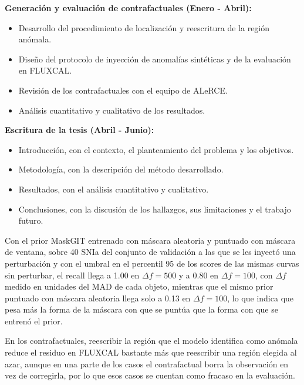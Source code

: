 \documentclass[11pt]{article}
\newcommand{\seccion}[1]{\vspace{6pt}\noindent{\large\textbf{$\bullet$ #1}}\par\vspace{2pt}}
\begin{document}
\textbf{Generación y evaluación de contrafactuales (Enero - Abril):}
\begin{itemize}
    \item Desarrollo del procedimiento de localización y reescritura de la región anómala.
    \item Diseño del protocolo de inyección de anomalías sintéticas y de la evaluación en FLUXCAL.
    \item Revisión de los contrafactuales con el equipo de ALeRCE.
    \item Análisis cuantitativo y cualitativo de los resultados.
\end{itemize}

\textbf{Escritura de la tesis (Abril - Junio):}
\begin{itemize}
    \item Introducción, con el contexto, el planteamiento del problema y los objetivos.
    \item Metodología, con la descripción del método desarrollado.
    \item Resultados, con el análisis cuantitativo y cualitativo.
    \item Conclusiones, con la discusión de los hallazgos, sus limitaciones y el trabajo futuro.
\end{itemize}

\seccion{Resultados preliminares}

Con el prior MaskGIT entrenado con máscara aleatoria y puntuado con máscara de ventana, sobre 40 SNIa del conjunto de validación a las que se les inyectó una perturbación y con el umbral en el percentil 95 de los scores de las mismas curvas sin perturbar, el recall llega a 1.00 en $\Delta f = 500$ y a 0.80 en $\Delta f = 100$, con $\Delta f$ medido en unidades del MAD de cada objeto, mientras que el mismo prior puntuado con máscara aleatoria llega solo a 0.13 en $\Delta f = 100$, lo que indica que pesa más la forma de la máscara con que se puntúa que la forma con que se entrenó el prior.

En los contrafactuales, reescribir la región que el modelo identifica como anómala reduce el residuo en FLUXCAL bastante más que reescribir una región elegida al azar, aunque en una parte de los casos el contrafactual borra la observación en vez de corregirla, por lo que esos casos se cuentan como fracaso en la evaluación.
\end{document}
